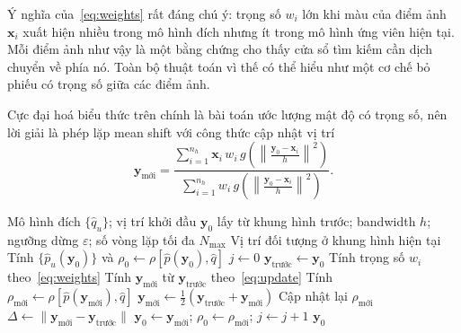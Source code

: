 \documentclass[12pt,a4paper]{article}
\numberwithin{equation}{section}
\begin{document}
Ý nghĩa của~\eqref{eq:weights} rất đáng chú ý: trọng số $w_i$ lớn khi màu của điểm ảnh
$\mathbf{x}_i$ xuất hiện nhiều trong mô hình đích nhưng ít trong mô hình ứng viên hiện tại. Mỗi
điểm ảnh như vậy là một bằng chứng cho thấy cửa sổ tìm kiếm cần dịch chuyển về phía nó. Toàn bộ
thuật toán vì thế có thể hiểu như một cơ chế bỏ phiếu có trọng số giữa các điểm ảnh.

Cực đại hoá biểu thức trên chính là bài toán ước lượng mật độ có trọng số, nên lời giải là phép
lặp mean shift với công thức cập nhật vị trí
\begin{equation}
\mathbf{y}_{\text{mới}} = \frac{\displaystyle\sum_{i=1}^{n_h} \mathbf{x}_i\, w_i\,
g\!\left(\left\|\frac{\mathbf{y}_0-\mathbf{x}_i}{h}\right\|^{2}\right)}
{\displaystyle\sum_{i=1}^{n_h} w_i\,
g\!\left(\left\|\frac{\mathbf{y}_0-\mathbf{x}_i}{h}\right\|^{2}\right)}.
\label{eq:update}
\end{equation}

\begin{algorithm}[H]
\caption{Bám đối tượng bằng MeanShift trên một khung hình}
\label{alg:meanshift}
\begin{algorithmic}[1]
\Require Mô hình đích $\{\hat q_u\}$; vị trí khởi đầu $\mathbf{y}_0$ lấy từ khung hình trước;
bandwidth $h$; ngưỡng dừng $\varepsilon$; số vòng lặp tối đa $N_{\max}$
\Ensure Vị trí đối tượng ở khung hình hiện tại
\State Tính $\{\hat p_u(\mathbf{y}_0)\}$ và $\rho_0 \leftarrow \rho[\hat p(\mathbf{y}_0), \hat q]$
\State $j \leftarrow 0$
\Repeat
  \State $\mathbf{y}_{\text{trước}} \leftarrow \mathbf{y}_0$
  \State Tính trọng số $w_i$ theo~\eqref{eq:weights}
  \State Tính $\mathbf{y}_{\text{mới}}$ từ $\mathbf{y}_{\text{trước}}$ theo~\eqref{eq:update}
  \State Tính $\rho_{\text{mới}} \leftarrow \rho[\hat p(\mathbf{y}_{\text{mới}}), \hat q]$
     \State $\mathbf{y}_{\text{mới}} \leftarrow \tfrac{1}{2}(\mathbf{y}_{\text{trước}} + \mathbf{y}_{\text{mới}})$
     \State Cập nhật lại $\rho_{\text{mới}}$
  \EndWhile
  \State $\Delta \leftarrow \|\mathbf{y}_{\text{mới}} - \mathbf{y}_{\text{trước}}\|$
  \State $\mathbf{y}_0 \leftarrow \mathbf{y}_{\text{mới}}$;\quad
         $\rho_0 \leftarrow \rho_{\text{mới}}$;\quad
         $j \leftarrow j + 1$
\State \Return $\mathbf{y}_0$
\end{algorithmic}
\end{algorithm}
\end{document}
